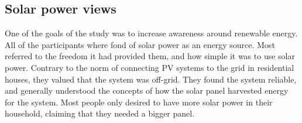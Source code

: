 \subsection{Solar power views}
One of the goals of the study was to increase awareness around renewable energy. All of the participants where fond of solar power as an energy source. Most referred to the freedom it had provided them, and how simple it was to use solar power. Contrary to the norm of connecting PV systems to the grid in residential houses, they valued that the system was off-grid. They found the system reliable, and generally understood the concepts of how the solar panel harvested energy for the system. Most people only desired to have more solar power in their household, claiming that they needed a bigger panel. 
